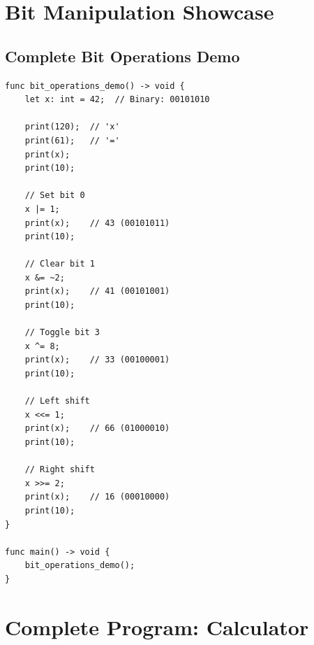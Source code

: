 \documentclass[12pt,a4paper,oneside]{book}
\begin{document}
\section{Bit Manipulation Showcase}

\subsection{Complete Bit Operations Demo}

\begin{lstlisting}[style=algo, caption={Comprehensive Bit Manipulation}]
func bit_operations_demo() -> void {
    let x: int = 42;  // Binary: 00101010
    
    print(120);  // 'x'
    print(61);   // '='
    print(x);
    print(10);
    
    // Set bit 0
    x |= 1;
    print(x);    // 43 (00101011)
    print(10);
    
    // Clear bit 1
    x &= ~2;
    print(x);    // 41 (00101001)
    print(10);
    
    // Toggle bit 3
    x ^= 8;
    print(x);    // 33 (00100001)
    print(10);
    
    // Left shift
    x <<= 1;
    print(x);    // 66 (01000010)
    print(10);
    
    // Right shift
    x >>= 2;
    print(x);    // 16 (00010000)
    print(10);
}

func main() -> void {
    bit_operations_demo();
}
\end{lstlisting}

\section{Complete Program: Calculator}
\end{document}

